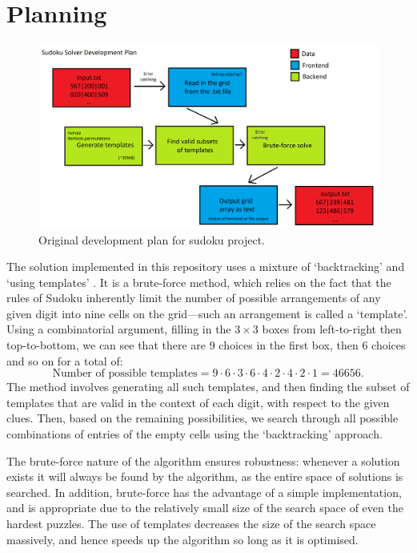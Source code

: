 \documentclass[12pt]{article}
\begin{document}
\section{Planning}

\begin{figure}[hbt]
    \includegraphics[scale=0.22]{sudokuplan1.png}
    \caption{Original development plan for sudoku project.}
    \label{plan1}
\end{figure}

The solution implemented in this repository uses a mixture of `backtracking' and `using templates' \cite{wiki1}.
It is a brute-force method, which relies on the fact that the rules of Sudoku inherently limit the number of possible arrangements of any given digit into nine cells on the grid---such an arrangement is called a `template'.
Using a combinatorial argument, filling in the $3\times3$ boxes from left-to-right then top-to-bottom, we can see that there are 9 choices in the first box, then 6 choices and so on for a total of:
\[
    \text{Number of possible templates} = 9\cdot6\cdot3\cdot6\cdot4\cdot2\cdot4\cdot2\cdot1 = 46656.
\]
The method involves generating all such templates, and then finding the subset of templates that are valid in the context of each digit, with respect to the given clues.
Then, based on the remaining possibilities, we search through all possible combinations of entries of the empty cells using the `backtracking' approach.

The brute-force nature of the algorithm ensures robustness: whenever a solution exists it will always be found by the algorithm, as the entire space of solutions is searched.
In addition, brute-force has the advantage of a simple implementation, and is appropriate due to the relatively small size of the search space of even the hardest puzzles.
The use of templates decreases the size of the search space massively, and hence speeds up the algorithm so long as it is optimised.
\end{document}
